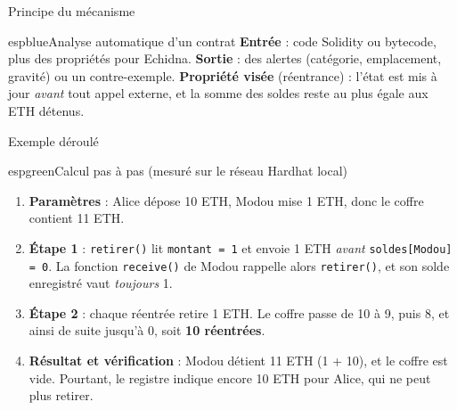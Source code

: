 \documentclass[11pt,aspectratio=169]{beamer}
\begin{document}
\begin{frame}{Principe du mécanisme}
  \begin{bloc}{espblue}{Analyse automatique d'un contrat}
    \small \textbf{Entrée} : code Solidity ou bytecode, plus des propriétés pour Echidna. \textbf{Sortie} : des alertes (catégorie, emplacement, gravité) ou un contre-exemple. \textbf{Propriété visée} (réentrance) : l'état est mis à jour \emph{avant} tout appel externe, et la somme des soldes reste au plus égale aux ETH détenus.
  \end{bloc}
  \vspace{2pt}
  \centering
\end{frame}

\begin{frame}{Exemple déroulé}
  \begin{bloc}{espgreen}{Calcul pas à pas (mesuré sur le réseau Hardhat local)}
    \small
    \begin{enumerate}
      \item \textbf{Paramètres} : Alice dépose 10 ETH, Modou mise 1 ETH, donc le coffre contient 11 ETH.
      \item \textbf{Étape 1} : \texttt{retirer()} lit \texttt{montant = 1} et envoie 1 ETH \emph{avant} \texttt{soldes[Modou] = 0}. La fonction \texttt{receive()} de Modou rappelle alors \texttt{retirer()}, et son solde enregistré vaut \emph{toujours} 1.
      \item \textbf{Étape 2} : chaque réentrée retire 1 ETH. Le coffre passe de 10 à 9, puis 8, et ainsi de suite jusqu'à 0, soit \textbf{10 réentrées}.
      \item \textbf{Résultat et vérification} : Modou détient 11 ETH (1 + 10), et le coffre est vide. Pourtant, le registre indique encore 10 ETH pour Alice, qui ne peut plus retirer.
    \end{enumerate}
  \end{bloc}
\end{frame}
\end{document}
